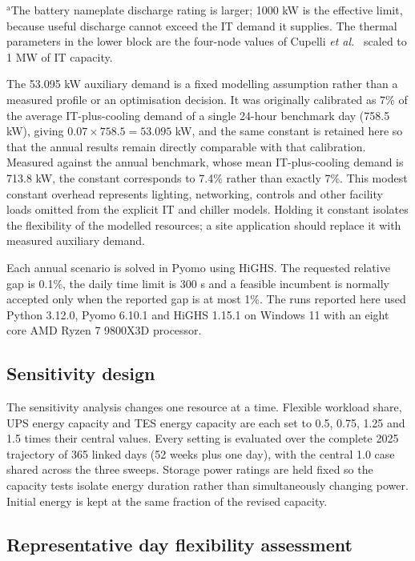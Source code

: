 \begin{table}[!t]
\vspace{3pt}
\parbox{\textwidth}{\footnotesize $^{\mathrm{a}}$The battery nameplate discharge
rating is larger; 1000 kW is the effective limit, because useful discharge cannot
exceed the IT demand it supplies. The thermal parameters in the lower block are
the four-node values of Cupelli \emph{et al.}~\cite{cupelli2018data} scaled to
1 MW of IT capacity.}
\end{table}

The 53.095 kW auxiliary demand is a fixed modelling assumption rather than a
measured profile or an optimisation decision. It was originally calibrated as
7\% of the average IT-plus-cooling demand of a single 24-hour benchmark day
(758.5 kW), giving $0.07\times758.5=53.095$ kW, and the same constant is
retained here so that the annual results remain directly comparable with that
calibration. Measured against the annual benchmark, whose mean IT-plus-cooling
demand is 713.8 kW, the constant corresponds to 7.4\% rather than exactly 7\%.
This modest constant overhead represents lighting,
networking, controls and other facility loads omitted from the explicit IT and
chiller models. Holding it constant isolates the flexibility of the modelled
resources; a site application should replace it with measured auxiliary demand.

Each annual scenario is solved in Pyomo using HiGHS. The requested relative gap
is 0.1\%, the daily time limit is 300 s and a feasible incumbent is normally
accepted only when the reported gap is at most 1\%. The runs reported here used
Python 3.12.0, Pyomo 6.10.1 and HiGHS 1.15.1 on Windows 11 with an eight core AMD
Ryzen 7 9800X3D processor.

\subsection{Sensitivity design}

The sensitivity analysis changes one resource at a time. Flexible workload
share, UPS energy capacity and TES energy capacity are each set to 0.5, 0.75,
1.25 and 1.5 times their central values. Every setting is evaluated over the
complete 2025 trajectory of 365 linked days (52 weeks plus one day), with the
central 1.0 case shared across the three sweeps. Storage power ratings are held
fixed so the capacity tests isolate energy duration rather than simultaneously
changing power. Initial energy is kept at the same fraction of the revised
capacity.

\subsection{Representative day flexibility assessment}\label{sec:flex-method}

